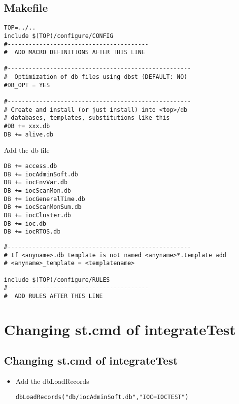 \documentclass[11pt
  , a4paper
  , article
  , oneside
]{memoir}
\begin{document}
\subsection{Makefile}
\begin{lstlisting}[style=termstyle]
TOP=../..
include $(TOP)/configure/CONFIG
#----------------------------------------
#  ADD MACRO DEFINITIONS AFTER THIS LINE

#----------------------------------------------------
#  Optimization of db files using dbst (DEFAULT: NO)
#DB_OPT = YES

#----------------------------------------------------
# Create and install (or just install) into <top>/db
# databases, templates, substitutions like this
#DB += xxx.db
DB += alive.db
\end{lstlisting}
Add the db file
\begin{lstlisting}[style=termstyle]
DB += access.db 
DB += iocAdminSoft.db
DB += iocEnvVar.db
DB += iocScanMon.db
DB += iocGeneralTime.db
DB += iocScanMonSum.db
DB += iocCluster.db
DB += ioc.db
DB += iocRTOS.db
\end{lstlisting}
\begin{lstlisting}[style=termstyle]
#----------------------------------------------------
# If <anyname>.db template is not named <anyname>*.template add
# <anyname>_template = <templatename>

include $(TOP)/configure/RULES
#----------------------------------------
#  ADD RULES AFTER THIS LINE
\end{lstlisting}

\section{Changing st.cmd of integrateTest}
\subsection{Changing st.cmd of integrateTest}
\begin{itemize}
	\item Add the dbLoadRecords
	\begin{lstlisting}[style=termstyle]
dbLoadRecords("db/iocAdminSoft.db","IOC=IOCTEST")
\end{lstlisting}
\end{itemize}
\end{document}
